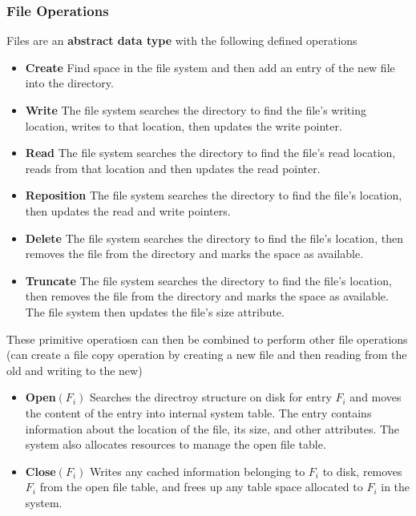 \documentclass[oneside]{book}
\begin{document}
                \subsubsection{File Operations}
                    Files are an \textbf{abstract data type} with the following defined operations
                    \begin{itemize}
                        \item \textbf{Create}
                            \subitem Find space in the file system and then add an entry of the new file into the directory.
                        \item \textbf{Write}
                            \subitem The file system searches the directory to find the file's writing location, writes to that location,
                            then updates the write pointer.
                        \item \textbf{Read}
                            \subitem The file system searches the directory to find the file's read location, reads from that
                            location and then updates the read pointer.
                        \item \textbf{Reposition}
                            \subitem The file system searches the directory to find the file's location, then updates the read
                            and write pointers.
                        \item \textbf{Delete}
                            \subitem The file system searches the directory to find the file's location, then removes the file 
                            from the directory and marks the space as available.
                        \item \textbf{Truncate}
                            \subitem The file system searches the directory to find the file's location, then removes the file 
                            from the directory and marks the space as available. The file system then updates the file's size 
                            attribute.
                    \end{itemize}
                    These primitive operatiosn can then be combined to perform other file operations (can create a file copy operation
                    by creating a new file and then reading from the old and writing to the new)
                    \begin{itemize}
                        \item \textbf{Open}$(F_i)$ 
                            \subitem Searches the directroy structure on disk for entry $F_i$ and moves the content of the entry 
                            into internal system table. The entry contains information about the location of the file, its size, 
                            and other attributes. The system also allocates resources to manage the open file table. 
                        \item \textbf{Close}$(F_i)$
                            \subitem Writes any cached information belonging to $F_i$ to disk, removes $F_i$ from the open file table, 
                            and frees up any table space allocated to $F_i$ in the system.
                    \end{itemize}
\end{document}

